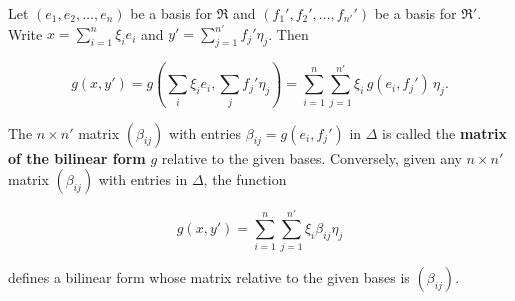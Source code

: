 Let $(e_1, e_2, \dots, e_n)$ be a basis for $\mathfrak{R}$ and $(f_1', f_2', \dots, f_{n'}')$ be a basis for $\mathfrak{R}'$. Write $x = \sum_{i=1}^{n} \xi_i e_i$ and $y' = \sum_{j=1}^{n'} f_j' \eta_j$. Then

$$g(x, y') = g\!\left(\sum_i \xi_i e_i, \sum_j f_j' \eta_j\right) = \sum_{i=1}^{n} \sum_{j=1}^{n'} \xi_i \, g(e_i, f_j') \, \eta_j.$$

The $n \times n'$ matrix $(\beta_{ij})$ with entries $\beta_{ij} = g(e_i, f_j')$ in $\Delta$ is called the \textbf{matrix of the bilinear form} $g$ relative to the given bases. Conversely, given any $n \times n'$ matrix $(\beta_{ij})$ with entries in $\Delta$, the function

$$g(x, y') = \sum_{i=1}^{n} \sum_{j=1}^{n'} \xi_i \beta_{ij} \eta_j$$

defines a bilinear form whose matrix relative to the given bases is $(\beta_{ij})$.
